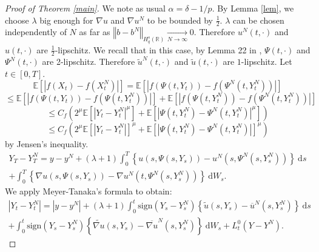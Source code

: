 \documentclass[11pt]{enstaPRE}
\newcommand{\norme}[1]{\left\Vert #1\right\Vert}
\newcommand{\R}{\mathbb{R}}
\newcommand{\E}{\mathbb{E}}
\newcommand{\di}{\mathrm{d}}
\begin{document}
\begin{proof}[Proof of Theorem \ref{main}]
    We note as usual $\alpha = \delta - 1/p$.
    By Lemma \ref{lem}, we choose $\lambda$ big enough for $\nabla u$ and $\nabla u^N$ to be bounded by $\frac{1}{2}$. $\lambda$ can be chosen independently of $N$ as far as $\norme{b - b^N}_{H_q^s(\R)} \underset{N\rightarrow\infty}{\longrightarrow} 0$. Therefore $u^N(t,\cdot)$ and $u(t,\cdot)$ are $\frac{1}{2}$-lipschitz. We recall that in this case, by Lemma 22 in \cite{Fla-Iss-Rus-2017}, $\Psi(t,\cdot)$ and $\Psi^N(t,\cdot)$ are 2-lipschitz. Therefore $\widetilde{u}^N(t,\cdot)$ and $\widetilde{u}(t,\cdot)$ are $1$-lipschitz. Let $t\in[0,T]$.      
    \begin{equation*}
    \E\left[\left|f\left(X_t\right)-f\left(X_t^N\right)\right|\right] = \E\left[\left|f\left(\Psi\left(t,Y_t\right)\right)-f\left(\Psi^N\left(t,Y_t^N\right)\right)\right|\right]
    \end{equation*}   
    \begin{equation*}
    \leq  \E\left[\left|f\left(\Psi\left(t,Y_t\right)\right)-f\left(\Psi\left(t,Y_t^N\right)\right)\right|\right]+\E\left[\left|f\left(\Psi\left(t,Y_t^N\right)\right)-f\left(\Psi^N\left(t,Y_t^N\right)\right)\right|\right]
    \end{equation*}  
    \begin{equation*}
    \leq C_f  \left(2^\mu\E\left[\left|Y_t-Y_t^N\right|^\mu\right]+\E\left[\left|\Psi\left(t,Y_t^N\right)-\Psi^N\left(t,Y_t^N\right)\right|^\mu\right]\right)
    \end{equation*}
    \begin{equation}\label{jensen}
    \leq C_f  \left(2^\mu\E\left[\left|Y_t-Y_t^N\right|\right]^\mu+\E\left[\left|\Psi\left(t,Y_t^N\right)-\Psi^N\left(t,Y_t^N\right)\right|\right]^\mu\right)
    \end{equation}    
    by Jensen's inequality. 
    \begin{multline*}
    Y_T-Y_T^N = y-y^N + (\lambda + 1 )\int_0^T\left\{u\left(s,\Psi\left(s,Y_s\right)\right)-u^N\left(s,\Psi^N\left(s,Y_s^N\right)\right)\right\}\ \di s\\ + \int_0^T\left\{\nabla u\left(s,\Psi\left(s,Y_s\right)\right)-\nabla u^N\left(t,\Psi^N\left(s,Y_s^N\right)\right)\right\}\ \di W_s.
    \end{multline*}
    We apply Meyer-Tanaka's formula to obtain:
    \begin{multline*}
    \left|Y_t-Y_t^N\right| = \left|y-y^N\right| + (\lambda + 1) \int_0^t\mathrm{sign}(Y_s-Y_s^N)\left\{\widetilde{u}\left(s,Y_s\right)-\overline{u}^N\left(s,Y_s^N\right)\right\}\ \di s\\ + \int_0^t\mathrm{sign}(Y_s-Y_s^N)\left\{\widetilde{\nabla u}\left(s,Y_s\right)-\overline{\nabla u}^N\left(s,Y_s^N\right)\right\}\ \di W_s + L_t^0(Y-Y^N).

\end{multline*}
\end{proof}
\end{document}

